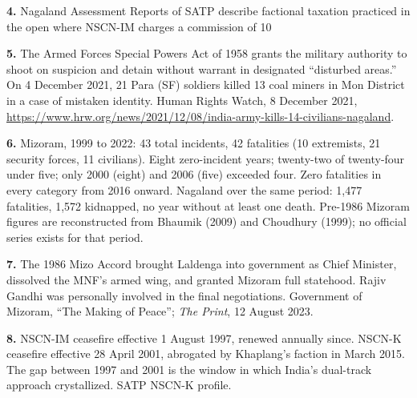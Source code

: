 \documentclass[12pt,a4paper]{article}
\begin{document}
\vspace{0.4em}

\noindent\textbf{4.} Nagaland Assessment Reports of SATP describe factional taxation practiced in the open where NSCN-IM charges a commission of 10%

\vspace{0.4em}

\noindent\textbf{5.} The Armed Forces Special Powers Act of 1958 grants the military authority to shoot on suspicion and detain without warrant in designated ``disturbed areas.'' On 4 December 2021, 21 Para (SF) soldiers killed 13 coal miners in Mon District in a case of mistaken identity. Human Rights Watch, 8 December 2021, \url{https://www.hrw.org/news/2021/12/08/india-army-kills-14-civilians-nagaland}.

\vspace{0.4em}

\noindent\textbf{6.} Mizoram, 1999 to 2022: 43 total incidents, 42 fatalities (10 extremists, 21 security forces, 11 civilians). Eight zero-incident years; twenty-two of twenty-four under five; only 2000 (eight) and 2006 (five) exceeded four. Zero fatalities in every category from 2016 onward. Nagaland over the same period: 1,477 fatalities, 1,572 kidnapped, no year without at least one death. Pre-1986 Mizoram figures are reconstructed from Bhaumik (2009) and Choudhury (1999); no official series exists for that period.

\vspace{0.4em}

\noindent\textbf{7.} The 1986 Mizo Accord brought Laldenga into government as Chief Minister, dissolved the MNF's armed wing, and granted Mizoram full statehood. Rajiv Gandhi was personally involved in the final negotiations. Government of Mizoram, ``The Making of Peace''; \textit{The Print}, 12 August 2023.

\vspace{0.4em}

\noindent\textbf{8.} NSCN-IM ceasefire effective 1 August 1997, renewed annually since. NSCN-K ceasefire effective 28 April 2001, abrogated by Khaplang's faction in March 2015. The gap between 1997 and 2001 is the window in which India's dual-track approach crystallized. SATP NSCN-K profile.

\vspace{0.4em}
\end{document}
